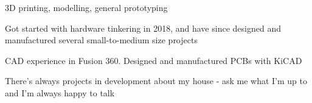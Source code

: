 \begin{cventries}
  \cventry
    {3D printing, modelling, general prototyping}
    {}
    {}
    {}
    {
      \begin{cvitems}
        \item {Got started with hardware tinkering in 2018, and have since designed and manufactured several small-to-medium size projects}
        \item {CAD experience in Fusion 360. Designed and manufactured PCBs with KiCAD}
        \item {There's always projects in development about my house - ask me what I'm up to and I'm always happy to talk}
      \end{cvitems}
    }

\end{cventries}
